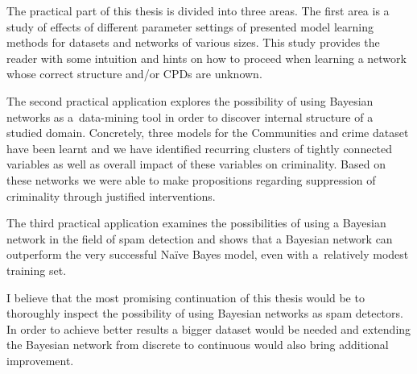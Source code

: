 \documentclass[english,cover]{fitthesis} %
\newcommand{\ignore}[1]{}                  %
\begin{document}
\smallskip
The practical part of this thesis is divided into three areas.
The first area is a study of effects of different parameter settings of presented model learning methods for datasets and networks of various sizes. This study provides the reader with some intuition and hints on how to proceed when learning a network whose correct structure and/or CPDs are unknown.

The second practical application explores the possibility of using Bayesian networks as a~data-mining tool in order to discover internal structure of a studied domain. Concretely, three models for the Communities and crime dataset have been learnt and we have identified recurring clusters of tightly connected variables as well as overall impact of these variables on criminality. Based on these networks we were able to make propositions regarding suppression of criminality through justified interventions.

The third practical application examines the possibilities of using a Bayesian network in the field of spam detection and shows that a Bayesian network can outperform the very successful Naïve Bayes model, even with a~relatively modest training set.

\smallskip
I believe that the most promising continuation of this thesis would be to thoroughly inspect the possibility of using Bayesian networks as spam detectors. In order to achieve better results a bigger dataset would be needed and extending the Bayesian network from discrete to continuous would also bring additional improvement.


\ignore{
\bigskip

My original contributions:
\begin{itemize}
	\item I myself devised some proofs and nice formal theories: Joint probability distribution induces by a BN indeed is a probability distribution (sums to one). Derivation of the formula for weighted sampling. Nice theory for finding all possible alterations of a network (for state-space search in structure learning).
\end{itemize}

What I did in the practical part:
\begin{itemize}
    \item I have demonstrated the analysis which should be performed if our goal is to learn network parameters as accurately as possible. I also examined relation of the ability to learn the \uv{true} structure and dataset size.
    \item A more general Bayesian network can perform better than Naïve Bayes model in context of spam filtering. Supposedly, mostly with large datasets (Bayesian network has higher variance).
\end{itemize}
}
\end{document}
